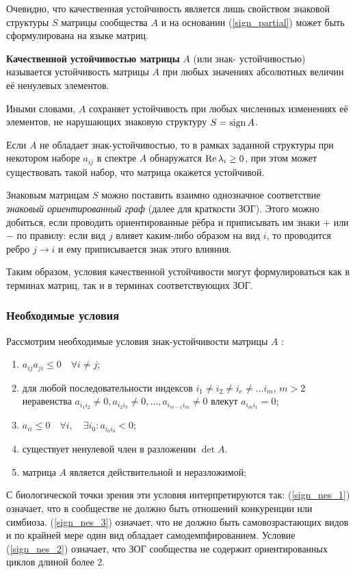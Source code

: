     Очевидно, что качественная устойчивость является лишь свойством знаковой структуры \(S\) матрицы сообщества \(A\) и на основании (\ref{sign_partial}) может быть сформулирована на языке матриц.
    \begin{definition}
        \textbf{Качественной устойчивостью матрицы} \(A\) (или знак- \hspace{-2pt}устойчивостью) называется устойчивость матрицы \(A\) при любых значениях абсолютных величин её ненулевых элементов.
    \end{definition}
    Иными словами, \(A\) сохраняет устойчивость при любых численных изменениях её элементов, не нарушающих знаковую структуру \(S = \operatorname{sign} A\).

    Если \(A\) не обладает знак-устойчивостью, то в рамках заданной структуры при некотором наборе \({a_{ij}}\) в спектре \(A\) обнаружатся \(\operatorname{Re} \lambda_i \geq 0\), при этом может существовать такой набор, что матрица окажется устойчивой.

    Знаковым матрицам \(S\) можно поставить взаимно однозначное соответствие \textit{знаковый ориентированный граф} (далее для краткости ЗОГ). Этого можно добиться, если проводить ориентированные рёбра и приписывать им знаки \(+\) или \(-\) по правилу: если вид \(j\) влияет каким-либо образом на вид \(i\), то проводится ребро \(j \to i\) и ему приписывается знак этого влияния. 

    Таким образом, условия качественной устойчивости могут формулироваться как в терминах матриц, так и в терминах соответствующих ЗОГ.

    \subsubsection{Необходимые условия}

    Рассмотрим необходимые условия знак-устойчивости матрицы \(A\) \cite{quirk_rupert}:
    \begin{enumerate}
        \item \(a_{ij} a_{ji} \leq 0 \quad \forall i \neq j\); \label{sign_nes_1}
        \item для любой последовательности индексов \(i_1 \neq i_2 \neq i_e \neq \dots i_m \), \(m > 2\) неравенства \(a_{i_1 i_2} \neq 0, a_{i_2 i_3} \neq 0, \dots, a_{i_{m-1} i_m} \neq 0\) влекут \(a_{i_m i_1} = 0\); \label{sign_nes_2}
        \item \(a_{ii} \leq 0 \quad \forall i, \quad \exists i_0 : a_{i_0 i_0} < 0\); \label{sign_nes_3}
        \item существует ненулевой член в разложении \(\det A\). \label{sign_nes_4}
        \item матрица \(A\) является действительной и неразложимой; \label{sign_nes_neraz}
    \end{enumerate}
    С биологической точки зрения эти условия интерпретируются так: (\ref{sign_nes_1}) означает, что в сообществе не должно быть отношений конкуренции или симбиоза. (\ref{sign_nes_3}) означает, что не должно быть самовозрастающих видов и по крайней мере один вид обладает самодемпфированием. Условие (\ref{sign_nes_2}) означает, что ЗОГ сообщества не содержит ориентированных циклов длиной более 2.

